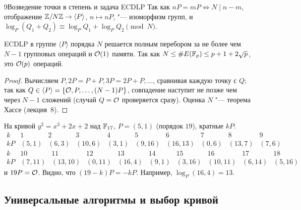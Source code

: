 \begin{lecture}{9}{Возведение точки в степень и задача ECDLP}
Так как $nP = mP \iff N \mid n - m$, отображение $\mathbb{Z}/N\mathbb{Z} \to \langle P \rangle$,
$n \mapsto nP$, "--- изоморфизм групп, и $\log_P(Q_1 + Q_2) \equiv \log_P Q_1 + \log_P Q_2
\pmod N$.

\begin{proposition}\label{l9:trivial}
ECDLP в группе $\langle P \rangle$ порядка $N$ решается полным перебором за не более чем $N - 1$
групповых операций и $\mathcal{O}(1)$ памяти. Так как $N \le \#E(\mathbb{F}_p) \le p + 1 + 2\sqrt p$,
это $\mathcal{O}(p)$ операций.
\end{proposition}

\begin{proof}
Вычисляем $P, 2P = P + P, 3P = 2P + P, \dots$, сравнивая каждую точку с $Q$; так как
$Q \in \langle P \rangle = \{\mathcal{O}, P, \dots, (N - 1)P\}$, совпадение наступит не позже чем
через $N - 1$ сложений (случай $Q = \mathcal{O}$ проверяется сразу). Оценка $N$ "--- теорема Хассе
(лекция~8).
\end{proof}

\begin{example}\label{l9:ex-trivial}
На кривой $y^2 = x^3 + 2x + 2$ над $\mathbb{F}_{17}$, $P = (5, 1)$ (порядок $19$), кратные $kP$:
\[
\begin{array}{c|ccccccccc}
  k  & 1 & 2 & 3 & 4 & 5 & 6 & 7 & 8 & 9 \\ \hline
  kP & (5,1) & (6,3) & (10,6) & (3,1) & (9,16) & (16,13) & (0,6) & (13,7) & (7,6)
\end{array}
\]
\[
\begin{array}{c|ccccccccc}
  k  & 10 & 11 & 12 & 13 & 14 & 15 & 16 & 17 & 18 \\ \hline
  kP & (7,11) & (13,10) & (0,11) & (16,4) & (9,1) & (3,16) & (10,11) & (6,14) & (5,16)
\end{array}
\]
и $19P = \mathcal{O}$. Видно, что $(19 - k)P = -kP$. Например, $\log_P (16, 4) = 13$.
\end{example}

\subsection{Универсальные алгоритмы и выбор кривой}


\end{lecture}

